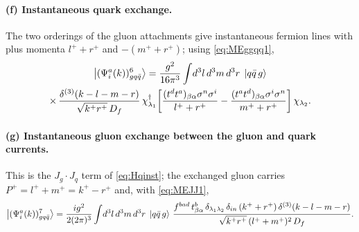 \paragraph{(f) Instantaneous quark exchange.}
\begin{center}
\end{center}
The two orderings of the gluon attachments give instantaneous fermion lines with plus momenta
$l^{+}+r^{+}$ and $-(m^{+}+r^{+})$; using \eqref{eq:MEggqq1},
\begin{multline}
\left|(\Psi^{a}_{i}(k))^{6}_{gq\bar q}\right\rangle=\frac{g^{2}}{16\pi^{3}}\int\!d^{3}l\,d^{3}m\,d^{3}r\;
\left|q\bar q\,g\right\rangle\\
\times\,
\frac{\delta^{(3)}(k-l-m-r)}{\sqrt{k^{+}r^{+}}\,D_{f}}\,
\chi^{\dagger}_{\lambda_{1}}\!\left[\frac{(t^{d}t^{a})_{\beta\alpha}\sigma^{n}\sigma^{i}}{l^{+}+r^{+}}
-\frac{(t^{a}t^{d})_{\beta\alpha}\sigma^{i}\sigma^{n}}{m^{+}+r^{+}}\right]\chi_{\lambda_{2}} .
\label{eq:B3f}
\end{multline}

\paragraph{(g) Instantaneous gluon exchange between the gluon and quark currents.}
\begin{center}
\end{center}
This is the $J_{g}\cdot J_{q}$ term of \eqref{eq:Hqinst}; the exchanged gluon carries
$P^{+}=l^{+}+m^{+}=k^{+}-r^{+}$ and, with \eqref{eq:MEJJ1},
\begin{equation}
\left|(\Psi^{a}_{i}(k))^{7}_{gq\bar q}\right\rangle=\frac{ig^{2}}{2(2\pi)^{3}}\int\!d^{3}l\,d^{3}m\,d^{3}r\;
\left|q\bar q\,g\right\rangle\,
\frac{f^{bad}\,t^{b}_{\beta\alpha}\,\delta_{\lambda_{1}\lambda_{2}}\,\delta_{in}\,(k^{+}+r^{+})\,
\delta^{(3)}(k-l-m-r)}{\sqrt{k^{+}r^{+}}\,(l^{+}+m^{+})^{2}\,D_{f}} .
\label{eq:B3g}
\end{equation}

